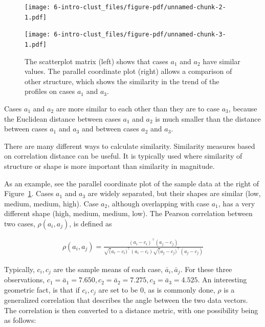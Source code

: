 \documentclass[
  letterpaper,
]{krantz}
\begin{document}
\begin{figure}

\begin{minipage}{0.50\linewidth}

\texttt{[image: 6-intro-clust\_files/figure-pdf/unnamed-chunk-2-1.pdf]}

\end{minipage}%
%
\begin{minipage}{0.50\linewidth}

\texttt{[image: 6-intro-clust\_files/figure-pdf/unnamed-chunk-3-1.pdf]}

\end{minipage}%

\caption{\label{fig-similarity1}The scatterplot matrix (left) shows that
cases \(a_1\) and \(a_2\) have similar values. The parallel coordinate
plot (right) allows a comparison of other structure, which shows the
similarity in the trend of the profiles on cases \(a_1\) and \(a_3\).}

\end{figure}%

\noindent Cases \(a_1\) and \(a_2\) are more similar to each other than
they are to case \(a_3\), because the Euclidean distance between cases
\(a_1\) and \(a_2\) is much smaller than the distance between cases
\(a_1\) and \(a_3\) and between cases \(a_2\) and \(a_3\).

There are many different ways to calculate similarity. Similarity
measures based on correlation distance can be useful. It is typically
used where similarity of structure or shape is more important than
similarity in magnitude.


As an example, see the parallel coordinate plot of the sample data at
the right of Figure~\ref{fig-similarity1}. Cases \(a_1\) and \(a_3\) are
widely separated, but their shapes are similar (low, medium, medium,
high). Case \(a_2\), although overlapping with case \(a_1\), has a very
different shape (high, medium, medium, low). The Pearson correlation
between two cases, \(\rho(a_i,a_j)\), is defined as

\begin{align*}
\rho(a_i,a_j) = \frac{(a_i-c_i)^\top(a_j-c_j)}
{\sqrt(a_i-c_i)^\top(a_i-c_i) \sqrt(a_j-c_j)^\top(a_j-c_j)}
\label{corc}
\end{align*}

\noindent Typically, \(c_i, c_j\) are the sample means of each case,
\(\bar{a}_i,\bar{a}_j\). For these three observations,
\(c_1=\bar{a}_1=7.650, c_2=\bar{a}_2=7.275, c_3=\bar{a}_3=4.525\). An
interesting geometric fact, is that if \(c_i, c_j\) are set to be 0, as
is commonly done, \(\rho\) is a generalized correlation that describes
the angle between the two data vectors. The correlation is then
converted to a distance metric, with one possibility being as follows:
\end{document}
